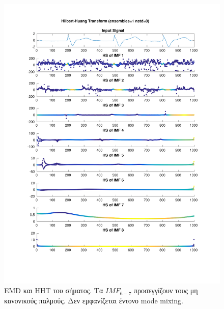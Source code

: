 \documentclass[11pt,a4paper]{article}
\begin{document}
\begin{figure}[H]
\begin{minipage}{0.48\textwidth}
	\includegraphics[width=\textwidth]{fig/217l1_hht.pdf}
\end{minipage}
\vfill
\caption{EMD και HHT του σήματος. Τα $IMF_{6-7}$ προσεγγίζουν τους μη κανονικούς παλμούς. Δεν εμφανίζεται έντονο mode mixing.}
\label{fig:217l1_hht}
\end{figure}
\end{document}
